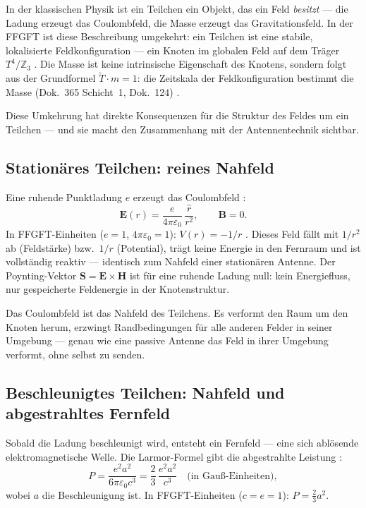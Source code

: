 In der klassischen Physik ist ein Teilchen ein Objekt, das ein Feld
\emph{besitzt} --- die Ladung erzeugt das Coulombfeld, die Masse erzeugt
das Gravitationsfeld. In der FFGFT ist diese Beschreibung umgekehrt: ein
Teilchen ist eine stabile, lokalisierte Feldkonfiguration --- ein Knoten
im globalen Feld auf dem Träger $T^4/\mathbb{Z}_3$ \SetzM. Die Masse ist
keine intrinsische Eigenschaft des Knotens, sondern folgt aus der
Grundformel $\tilde{T}\cdot m=1$: die Zeitskala der Feldkonfiguration
bestimmt die Masse (Dok.~365 Schicht~1, Dok.~124) \KM.

Diese Umkehrung hat direkte Konsequenzen für die Struktur des Feldes
um ein Teilchen --- und sie macht den Zusammenhang mit der Antennentechnik
sichtbar.

\subsection*{Stationäres Teilchen: reines Nahfeld}

Eine ruhende Punktladung $e$ erzeugt das Coulombfeld \EM:
\[
  \mathbf{E}(r) = \frac{e}{4\pi\varepsilon_0}\,\frac{\hat{r}}{r^2},
  \qquad
  \mathbf{B} = 0.
\]
In FFGFT-Einheiten ($e=1$, $4\pi\varepsilon_0=1$): $V(r) = -1/r$ \cite{PascherDok365}.
Dieses Feld fällt mit $1/r^2$ ab (Feldstärke) bzw.\ $1/r$ (Potential),
trägt keine Energie in den Fernraum und ist vollständig reaktiv ---
identisch zum Nahfeld einer stationären Antenne. Der Poynting-Vektor
$\mathbf{S} = \mathbf{E}\times\mathbf{H}$ ist für eine ruhende Ladung
null: kein Energiefluss, nur gespeicherte Feldenergie in der Knotenstruktur.

Das Coulombfeld ist das Nahfeld des Teilchens. Es verformt den Raum
um den Knoten herum, erzwingt Randbedingungen für alle anderen Felder
in seiner Umgebung --- genau wie eine passive Antenne das Feld in
ihrer Umgebung verformt, ohne selbst zu senden.

\subsection*{Beschleunigtes Teilchen: Nahfeld und abgestrahltes Fernfeld}

Sobald die Ladung beschleunigt wird, entsteht ein Fernfeld --- eine
sich ablösende elektromagnetische Welle. Die Larmor-Formel gibt die
abgestrahlte Leistung \cite{Jackson1999,Griffiths1999}:
\[
  P = \frac{e^2 a^2}{6\pi\varepsilon_0 c^3}
    = \frac{2}{3}\,\frac{e^2 a^2}{c^3}
  \quad \text{(in Gauß-Einheiten)},
\]
wobei $a$ die Beschleunigung ist. In FFGFT-Einheiten ($c=e=1$):
$P = \frac{2}{3}a^2$.

